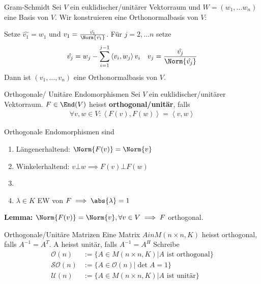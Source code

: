 \begin{algorithmus}{Gram-Schmidt}
    Sei $V$ ein euklidischer/unitärer Vektorraum und $W = (w_1, \ldots w_n)$ eine Basis von $V$. Wir konstruieren eine Orthonormalbasis von $V$:
    
    Setze $\hat{v_1} = w_1$ und $v_1 = \frac{\hat{v_1}}{\Norm{\hat{v_1}}}$. Für $j = 2, \ldots n$ setze
    \begin{align*}
        \hat{v_j} = w_j - \sum_{i = 1}^{j-1} \left<v_i,w_j\right>v_i \quad v_j = \frac{\hat{v_j}}{\Norm{\hat{v_j}}}
    \end{align*}
    Dann ist $(v_{1}, \ldots, v_{n})$ eine Orthonormalbasis von $V$.
\end{algorithmus}


\begin{definition}{Orthogonale/ Unitäre Endomorphismen}
    Sei $V$ ein euklidischer/unitärer Vektorraum. $F \in \End(V)$ heisst \textbf{orthogonal/unitär}, falls 
    \begin{align*}
        \forall v,w \in V: \left<F(v),F(w)\right> = \left<v,w\right>
    \end{align*}
\end{definition}
Orthogonale Endomorphismen sind
\begin{enumerate}
    \item	Längenerhaltend: $\Norm{F(v)} = \Norm{v}$
    \item   Winkelerhaltend: $v \bot w \implies F(v) \bot F(w)$
    \item   
    \item   $\lambda \in K$ EW von $F \implies \abs{\lambda} = 1$
\end{enumerate}

\textbf{Lemma:} \quad $\Norm{F(v)} = \Norm{v}, \forall v \in V \implies F$ orthogonal.

\begin{definition}{Orthogonale/Unitäre Matrizen}
    Eine Matrix $A in M(n\times n,K)$ heisst orthogonal,  falls $A^{-1} = A^T$. 
    A heisst unitär, falls $A^{-1} = A^H$
    Schreibe
    \begin{align*}
        \mathcal{O}(n) &:= \{A \in M(n\times n,K) \big\vert A \text{ ist orthogonal}\}\\
        \mathcal{SO}(n) &:= \{A \in \mathcal{O}(n)    \big\vert \det A = 1\}\\
        \mathcal{U}(n) &:= \{A \in M(n\times n,K) \big\vert A \text{ ist unitär}\}
    \end{align*}
\end{definition}

